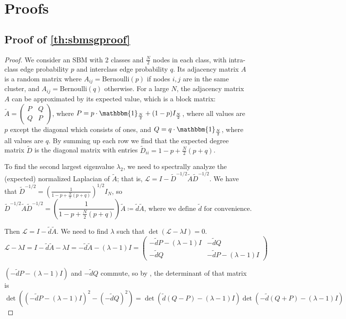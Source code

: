 \section{Proofs} \label{app:proofs}
\subsection{Proof of \autoref{th:sbmsgproof}}

\begin{proof} 
We consider an SBM with 2 classes and $\frac{N}{2}$ nodes in each class, with intra-class edge probability $p$ and interclass edge probability $q$. Its adjacency matrix $A$ is a random matrix where $A_{ij}=\text{Bernoulli}(p)$ if nodes $i,j$ are in the same cluster, and $A_{ij}=\text{Bernoulli}(q)$ otherwise.
For a large $N$, the adjacency matrix $A$ can be approximated by its expected value, which is a block matrix:
$\tilde{A}=\begin{pmatrix}
    P&Q\\Q&P
\end{pmatrix}$, where $P=p\cdot\mathbbm{1}_{\frac{N}{2}} + (1-p)I_{\frac{N}{2}}$, where all values are $p$ except the diagonal which consists of ones, and $Q=q\cdot\mathbbm{1}_{\frac{N}{2}}$, where all values are $q$.
By summing up each row we find that the expected degree matrix $\tilde{D}$ is the diagonal matrix with entries $\tilde{D}_{ii} = 1-p + \frac{N}{2}(p+q)$.

To find the second largest eigenvalue $\lambda_2$, we need to spectrally analyze the (expected) normalized Laplacian of $\tilde{A}$; that is, $\mathcal{L}=I-\tilde{D}^{-1/2}\tilde{A}\tilde{D}^{-1/2}$. We have that $\tilde{D}^{-1/2} = \left(\frac{1}{1-p + \frac{N}{2}(p+q)}\right)^{1/2}I_N$, so $$\tilde{D}^{-1/2}\tilde{A}\tilde{D}^{-1/2} = \left(\frac{1}{1-p + \frac{N}{2}(p+q)}\right)\tilde{A}\coloneqq \tilde{d}\tilde{A}\text{, where we define $\tilde{d}$ for convenience.}$$

Then $\mathcal{L}=I-\tilde{d}\tilde{A}$. We need to find $\lambda$ such that $\det\left(\mathcal{L}-\lambda I\right)  = 0$.  
$$\mathcal{L}-\lambda I 
= I-\tilde{d}\tilde{A}-\lambda I
= -\tilde{d}\tilde{A}-(\lambda-1) I
=\begin{pmatrix}
    -\tilde{d}P-(\lambda-1) I&-\tilde{d}Q\\-\tilde{d}Q&-\tilde{d}P-(\lambda-1) I
\end{pmatrix}$$ 

$(-\tilde{d}P-(\lambda-1) I)$ and $-\tilde{d}Q$ commute, so by \citep{Silvester_2000}, the determinant of that matrix is $$ \det\left(\left(-\tilde{d}P-(\lambda-1) I\right)^2 - \left(-\tilde{d}Q\right)^2\right) 
= \det\left(\tilde{d}(Q-P)-(\lambda-1) I\right)\det\left(-\tilde{d}(Q+P)-(\lambda-1) I\right)
$$


\end{proof}
